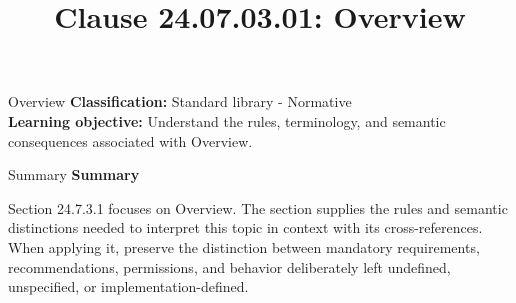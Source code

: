 \documentclass[10pt,letterpaper]{article}
\title{Clause 24.07.03.01: Overview}
\author{}
\date{}
\begin{document}
\maketitle
\begin{CornellOverviewBox}{Overview}
\textbf{Classification:} Standard library - Normative\\[2pt]
\textbf{Learning objective:} Understand the rules, terminology, and semantic consequences associated with Overview.
\end{CornellOverviewBox}\begin{CornellSummaryBox}{Summary}
{\sffamily\bfseries\color{Accent} Summary}\par\vspace{3pt}Section 24.7.3.1 focuses on Overview. The section supplies the rules and semantic distinctions needed to interpret this topic in context with its cross-references. When applying it, preserve the distinction between mandatory requirements, recommendations, permissions, and behavior deliberately left undefined, unspecified, or implementation-defined.
\end{CornellSummaryBox}
\end{document}
